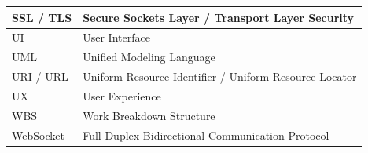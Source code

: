 \begin{center}
\begin{longtable}{|L{3.5cm}|L{11.5cm}|}
SSL / TLS & Secure Sockets Layer / Transport Layer Security \\ \hline
UI & User Interface \\ \hline
UML & Unified Modeling Language \\ \hline
URI / URL & Uniform Resource Identifier / Uniform Resource Locator \\ \hline
UX & User Experience \\ \hline
WBS & Work Breakdown Structure \\ \hline
WebSocket & Full-Duplex Bidirectional Communication Protocol \\ \hline
\end{longtable}
\end{center}

\setcounter{table}{0}

\newpage
